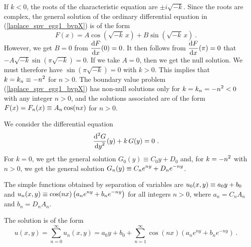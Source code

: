 \begin{egg}
If $k<0$, the roots of the characteristic equation are $\pm i \sqrt{-k}$.
Since the roots are complex, the general solution of the ordinary
differential equation in (\ref{laplace_spv_egg1_bvpX}) is of the form
\[
F(x) = A \cos\left(\sqrt{-k}\,x\right)
+ B \sin\left(\sqrt{-k}\,x\right) \ .
\]
However, we get $B =0$ from $\displaystyle \frac{\mathrm{d}F}{\mathrm{d}{x}}(0)=0$.  It then
follows from $\displaystyle \frac{\mathrm{d}F}{\mathrm{d}{x}}(\pi)=0$ that\\
$-A \sqrt{-k} \sin\left(\pi\sqrt{-k}\right) = 0$.  If we take $A=0$,
then we get the null solution.  We must therefore have
$\sin\left(\pi\sqrt{-k}\right) = 0$ with $k>0$.  This implies
that $\displaystyle k = k_n \equiv -n^2$ for $n>0$.  The boundary value
problem (\ref{laplace_spv_egg1_bvpX}) has non-null 
solutions only for $\displaystyle k=k_n = -n^2<0$ with any integer
$n>0$, and the solutions associated are of the form
$\displaystyle F(x)=F_n(x) \equiv A_n \cos(nx)$ for $n > 0$.

We consider the differential equation
\[
\frac{\displaystyle \mathrm{d}^{2}{G}} {\displaystyle \mathrm{d}{y}^{2}}(y) + k\,G(y) = 0 \ .
\]
For $k=0$, we get the general solution
$G_0(y) \equiv C_0 y + D_0$ and, for $\displaystyle k= -n^2$ with
$n>0$, we get the general solution
$\displaystyle G_n(y) \equiv C_n e^{ny} + D_n e^{-ny}$.

The simple functions obtained by separation of variables are
$\displaystyle u_0(x,y) \equiv a_0 y + b_0$ and
$\displaystyle u_n(x,y) \equiv \cos(n x)\left(a_n e^{n y} + b_n e^{-n y}\right)$
for all integers $n>0$, where $a_n = C_n A_n$ and $b_n = D_n A_n$.

The solution is of the form
\[
u(x,y) = \sum_{n=0}^\infty u_n(x,y) =  a_0 y + b_0
+ \sum_{n=1}^\infty \cos(n x)\left(a_n e^{n y} + b_n e^{-n y}\right) \ .
\]


\end{egg}
